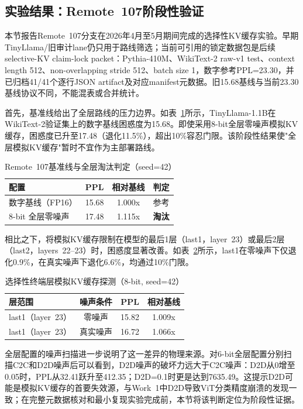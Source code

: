 \subsection{实验结果：Remote~107阶段性验证}
\label{sec:work2_results}

本节报告Remote~107分支在2026年4月至5月期间完成的选择性KV缓存实验。早期TinyLlama/旧审计lane仍只用于路线筛选；当前可引用的锁定数据包是后续selective-KV claim-lock packet：Pythia-410M、WikiText-2 raw-v1 test、context length 512、non-overlapping stride 512、batch size 1，数字参考PPL=23.30，并已归档41/41个逐行JSON artifact及对应manifest元数据。旧15.68基线与当前23.30基线协议不同，不能混表或合并统计。

首先，基准线给出了全层路线的压力边界。如表~\ref{tab:work2_baseline}所示，TinyLlama-1.1B在WikiText-2验证集上的数字基线困惑度为15.68。即使采用8-bit全层零噪声模拟KV缓存，困惑度已升至17.48（退化11.5\%），超出10\%容忍门限。该阶段性结果使"全层模拟KV缓存"暂时不宜作为主部署路线。

\begin{table}[htbp]
\centering
\caption{Remote~107基准线与全层淘汰判定（seed=42）}
\label{tab:work2_baseline}
\begin{tabular}{lccc}
\toprule
配置 & PPL & 相对基线 & 判定 \\
\midrule
数字基线（FP16） & 15.68 & 1.000x & 参考 \\
8-bit 全层零噪声 & 17.48 & 1.115x & \textbf{淘汰} \\
\bottomrule
\end{tabular}
\end{table}

相比之下，将模拟KV缓存限制在模型的最后1层（last1，layer~23）或最后2层（last2，layers~22--23）时，困惑度显著改善。如表~\ref{tab:work2_selective}所示，last1在零噪声下仅退化0.9\%，在真实噪声下退化6.6\%，均通过10\%门限。

\begin{table}[htbp]
\centering
\caption{选择性终端层模拟KV缓存探测（8-bit, seed=42）}
\label{tab:work2_selective}
\begin{tabular}{lccc}
\toprule
层范围 & 噪声条件 & PPL & 相对基线 \\
\midrule
last1（layer~23） & 零噪声 & 15.82 & 1.009x \\
last1（layer~23） & 真实噪声 & 16.72 & 1.066x \\
\bottomrule
\end{tabular}
\end{table}

全层配置的噪声扫描进一步说明了这一差异的物理来源。对6-bit全层配置分别扫描C2C和D2D噪声后可以看到，D2D噪声的破坏力远大于C2C噪声：D2D从0增至0.05时，PPL从32.41跃升至412.35；D2D=0.1时更是达到7635.49。这提示D2D可能是模拟KV缓存的首要失效源，与Work~1中D2D导致ViT分类精度崩溃的发现一致；在完整元数据核对和最小复现实验完成前，本节将该判断定位为阶段性证据。

